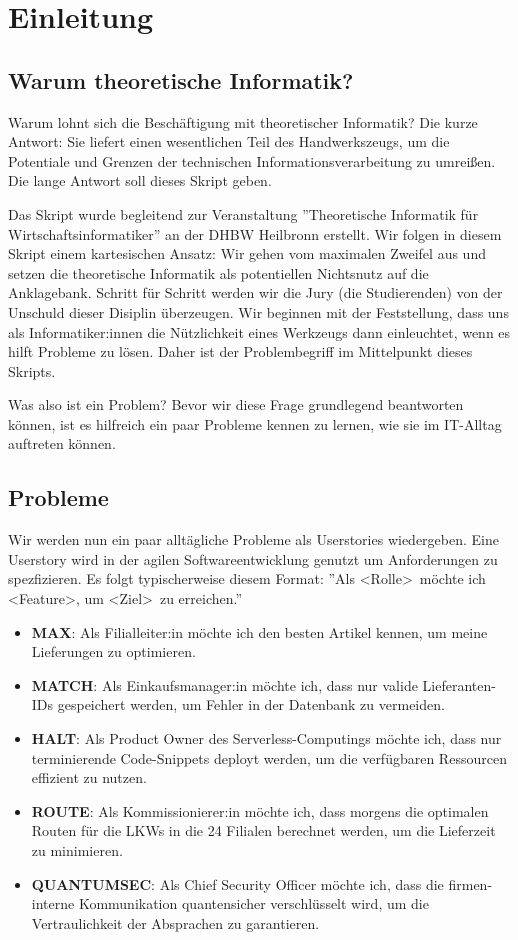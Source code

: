 \chapter{Einleitung}
\section{Warum theoretische Informatik?}
Warum lohnt sich die Beschäftigung mit theoretischer Informatik?
Die kurze Antwort: Sie liefert einen wesentlichen Teil des Handwerkszeugs,
um die Potentiale und Grenzen der technischen Informationsverarbeitung zu umreißen.
Die lange Antwort soll dieses Skript geben.

Das Skript wurde begleitend zur Veranstaltung ''Theoretische Informatik für Wirtschaftsinformatiker''
an der DHBW Heilbronn erstellt.
Wir folgen in diesem Skript einem kartesischen Ansatz:
Wir gehen vom maximalen Zweifel aus und setzen die theoretische Informatik
als potentiellen Nichtsnutz auf die Anklagebank.
Schritt für Schritt werden wir die Jury (die Studierenden) von der Unschuld dieser
Disiplin überzeugen.
Wir beginnen mit der Feststellung, dass uns als Informatiker:innen die Nützlichkeit
eines Werkzeugs dann einleuchtet, wenn es hilft Probleme zu lösen.
Daher ist der Problembegriff im Mittelpunkt dieses Skripts.

Was also ist ein Problem?
Bevor wir diese Frage grundlegend beantworten können,
ist es hilfreich ein paar Probleme kennen zu lernen,
wie sie im IT-Alltag auftreten können.

\section{Probleme}
Wir werden nun ein paar alltägliche Probleme als Userstories wiedergeben.
Eine Userstory wird in der agilen Softwareentwicklung genutzt um Anforderungen zu spezfizieren.
Es folgt typischerweise diesem Format:
''Als \textless Rolle\textgreater\ möchte ich \textless Feature\textgreater,
um \textless Ziel\textgreater\ zu erreichen.''

\begin{itemize}
    \item \textbf{MAX}: Als Filialleiter:in möchte ich den besten Artikel kennen,
        um meine Lieferungen zu optimieren.
    \item \textbf{MATCH}: Als Einkaufsmanager:in möchte ich,
        dass nur valide Lieferanten-IDs gespeichert werden,
        um Fehler in der Datenbank zu vermeiden.
    \item \textbf{HALT}: Als Product Owner des Serverless-Computings möchte ich,
        dass nur terminierende Code-Snippets deployt werden,
        um die verfügbaren Ressourcen effizient zu nutzen.
    \item \textbf{ROUTE}: Als Kommissionierer:in möchte ich,
        dass morgens die optimalen Routen für die LKWs in die 24 Filialen berechnet werden,
        um die Lieferzeit zu minimieren.
    \item \textbf{QUANTUMSEC}: Als Chief Security Officer möchte ich,
        dass die firmen-interne Kommunikation quantensicher verschlüsselt wird,
        um die Vertraulichkeit der Absprachen zu garantieren.
\end{itemize}

